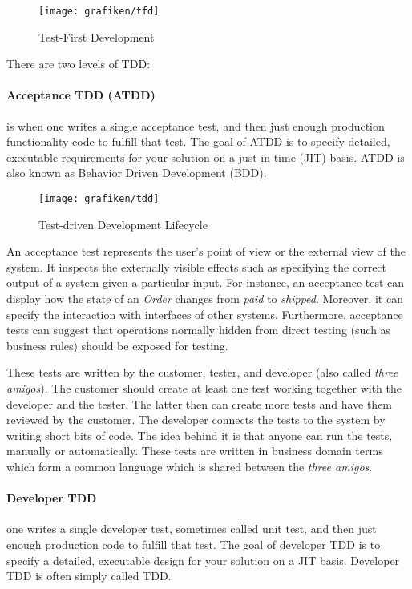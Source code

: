 \begin{figure}[H]
	\centering
    \texttt{[image: grafiken/tfd]}
    \caption{Test-First Development}
    \label{fig:tfd}
\end{figure}

There are two levels of TDD\cite{Ambler2013}:

\paragraph{Acceptance TDD (ATDD)} is when one writes a single acceptance test, and then just enough production functionality code to fulfill that test. The goal of ATDD is to specify detailed, executable requirements for your solution on a just in time (JIT) basis\cite{Ambler2013}. ATDD is also known as Behavior Driven Development (BDD).

\begin{figure}[H]
	\centering
    \texttt{[image: grafiken/tdd]}
    \caption{Test-driven Development Lifecycle\cite{Ambler2013}}
    \label{fig:tdd}
\end{figure}

An acceptance test represents the user's point of view or the external view of the system. It inspects the externally visible effects such as specifying the correct output of a system given a particular input. For instance, an acceptance test can display how the state of an \emph{Order} changes from \emph{paid} to \emph{shipped}. Moreover, it can specify the interaction with interfaces of other systems. Furthermore, acceptance tests can suggest that operations normally hidden from direct testing (such as business rules) should be exposed for testing\cite{KennethPugh2011}.

These tests are written by the customer, tester, and developer (also called \emph{three amigos}\cite{Dinwiddie2009}). The customer should create at least one test working together with the developer and the tester. The latter then can create more tests and have them reviewed by the customer. The developer connects the tests to the system by writing short bits of code. The idea behind it is that anyone can run the tests, manually or automatically. These tests are written in business domain terms which form a common language which is shared between the \emph{three amigos}\cite{KennethPugh2011}.

\paragraph{Developer TDD} one writes a single developer test, sometimes called unit test, and then just enough production code to fulfill that test. The goal of developer TDD is to specify a detailed, executable design for your solution on a JIT basis. Developer TDD is often simply called TDD\cite{Ambler2013}.

